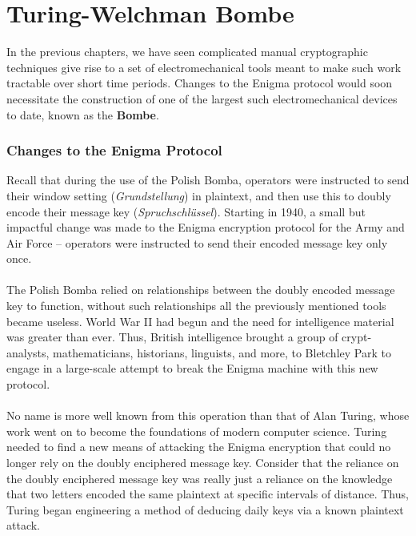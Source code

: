

\chapter{Turing-Welchman Bombe}

In the previous chapters, we have seen complicated manual
cryptographic techniques give rise to a set of electromechanical
tools meant to make such work tractable over short time periods.
Changes to the Enigma protocol would soon necessitate the
construction of one of the largest such electromechanical devices to
date, known as the {\bf{Bombe}}.

\subsection{Changes to the Enigma Protocol}
Recall that during the use of the Polish Bomba, operators were
instructed to send their window setting (\emph{Grundstellung}) in
plaintext, and then use this to doubly encode their message key
(\emph{Spruchschlüssel}). Starting in 1940, a small but impactful
change was made to the Enigma encryption protocol for the Army and
Air Force -- operators were instructed to send their encoded message
key only once.
\\\\The Polish Bomba relied on relationships between the doubly
encoded message key to function, without such relationships all the
previously mentioned tools became useless. World War II had begun and
the need for intelligence material was greater than ever. Thus,
British intelligence brought a group of crypt-analysts,
mathematicians, historians, linguists, and more, to Bletchley Park to
engage in a large-scale attempt to break the Enigma machine with this
new protocol.
\\\\No name is more well known from this operation than that of Alan
Turing, whose work went on to become the foundations of modern
computer science. Turing needed to find a new means of attacking the
Enigma encryption that could no longer rely on the doubly enciphered
message key. Consider that the reliance on the doubly enciphered
message key was really just a reliance on the knowledge that two
letters encoded the same plaintext at specific intervals of distance.
Thus, Turing began engineering a method of deducing daily keys via a
known plaintext attack.


